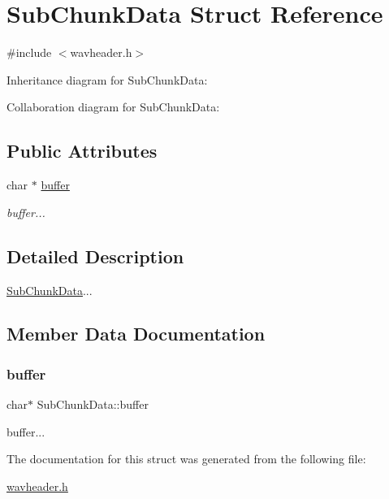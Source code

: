\hypertarget{structSubChunkData}{}\section{Sub\+Chunk\+Data Struct Reference}
\label{structSubChunkData}


{\ttfamily \#include $<$wavheader.\+h$>$}



Inheritance diagram for Sub\+Chunk\+Data\+:


Collaboration diagram for Sub\+Chunk\+Data\+:
\subsection*{Public Attributes}
\begin{DoxyCompactItemize}
\item 
char $\ast$ \hyperlink{structSubChunkData_a8f026b9f6a0e1f74318438e61656955e}{buffer}
\begin{DoxyCompactList}\small\item\em buffer... \end{DoxyCompactList}\end{DoxyCompactItemize}


\subsection{Detailed Description}
\hyperlink{structSubChunkData}{Sub\+Chunk\+Data}... 

\subsection{Member Data Documentation}
\mbox{\label{structSubChunkData_a8f026b9f6a0e1f74318438e61656955e}} 
\subsubsection{\texorpdfstring{buffer}{buffer}}
{\footnotesize\ttfamily char$\ast$ Sub\+Chunk\+Data\+::buffer}



buffer... 



The documentation for this struct was generated from the following file\+:\begin{DoxyCompactItemize}
\item 
\hyperlink{wavheader_8h}{wavheader.\+h}\end{DoxyCompactItemize}

